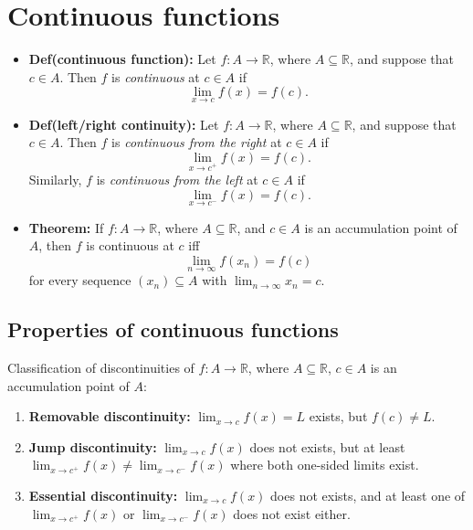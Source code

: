 \documentclass{article}
\begin{document}
\section{Continuous functions}

\begin{itemize}
\item \textbf{Def(continuous function):} Let $f: A \to \mathbb{R}$, where $A \subseteq \mathbb{R}$, and suppose that $c \in A$. Then $f$ is \emph{continuous} at $c \in A$ if
\[
\lim_{x \to c} f(x) = f(c).
\]

\item \textbf{Def(left/right continuity):} Let $f: A \to \mathbb{R}$, where $A \subseteq \mathbb{R}$, and suppose that $c \in A$. Then $f$ is \emph{continuous from the right} at $c \in A$ if
\[
\lim_{x \to c^+} f(x) = f(c).
\]
Similarly, $f$ is \emph{continuous from the left} at $c \in A$ if
\[
\lim_{x \to c^-} f(x) = f(c).
\]

\item \textbf{Theorem:} If $f: A \to \mathbb{R}$, where $A \subseteq \mathbb{R}$, and $c \in A$ is an accumulation point of $A$, then $f$ is continuous at $c$ iff
\[
\lim_{n \to \infty} f(x_n) = f(c)
\]
for every sequence $(x_n) \subseteq A$ with $\displaystyle \lim_{n \to \infty} x_n = c$.
\end{itemize}

\subsection{Properties of continuous functions}

Classification of discontinuities of $f: A \to \mathbb{R}$, where $A \subseteq \mathbb{R}$, $c \in A$ is an accumulation point of $A$:
\begin{enumerate}
\item \textbf{Removable discontinuity:} $\displaystyle \lim_{x \to c} f(x) = L$ exists, but $f(c) \neq L$.
\item \textbf{Jump discontinuity:} $\displaystyle \lim_{x \to c} f(x)$ does not exists, but at least $\displaystyle \lim_{x \to c^+} f(x) \neq \lim_{x \to c^-} f(x)$ where both one-sided limits exist.
\item \textbf{Essential discontinuity:} $\displaystyle \lim_{x \to c} f(x)$ does not exists, and at least one of $\displaystyle \lim_{x \to c^+} f(x)$ or $\displaystyle \lim_{x \to c^-} f(x)$ does not exist either.
\end{enumerate}
\end{document}
